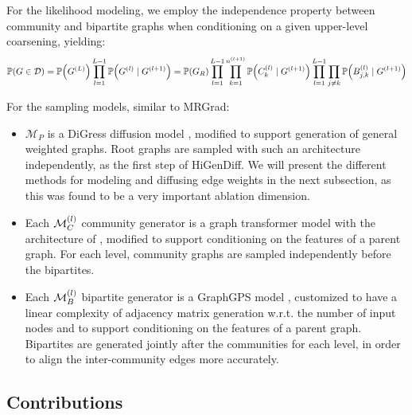 For the likelihood modeling, we employ the independence property between community and bipartite graphs when conditioning on a given upper-level coarsening, yielding:
\begin{equation}
\mathbb{P}\mathopen{}\left(G \in \mathcal{D}\right)=\mathbb{P}\mathopen{}\left(G^{\mathopen{}\left(L\right)}\right)\prod_{l=1}^{L-1}{\mathbb{P}\mathopen{}\left(G^{\mathopen{}\left(l\right)} \mid G^{\mathopen{}\left(l+1\right)}\right)}=\mathbb{P}\mathopen{}\left(G_R\right)\prod_{l=1}^{L-1}\prod_{k=1}^{n^{\mathopen{}\left(l+1\right)}}{\mathbb{P}\mathopen{}\left(C_{k}^{\mathopen{}\left(l\right)} \mid G^{\mathopen{}\left(l+1\right)}\right)}\prod_{l=1}^{L-1}\prod_{j \neq k}{\mathbb{P}\mathopen{}\left(B_{j,k}^{\mathopen{}\left(l\right)} \mid G^{\mathopen{}\left(l+1\right)}\right)}     
\end{equation}

For the sampling models, similar to MRGrad:
\begin{itemize}
    \item $\mathcal{M}_P$ is a DiGress diffusion model \cite{vignac_digress_2022}, modified to support generation of general weighted graphs. Root graphs are sampled with such an architecture independently, as the first step of HiGenDiff. We will present the different methods for modeling and diffusing edge weights in the next subsection, as this was found to be a very important ablation dimension. 
    \item Each $\mathcal{M}^{\mathopen{}\left(l\right)}_C$ community generator is a graph transformer model with the architecture of \cite{dwivedi_generalization_2021}, modified to support conditioning on the features of a parent graph. For each level, community graphs are sampled independently before the bipartites.
    \item Each $\mathcal{M}^{\mathopen{}\left(l\right)}_B$ bipartite generator is a GraphGPS model \cite{rampasek_recipe_2022}, customized to have a linear complexity of adjacency matrix generation w.r.t. the number of input nodes and to support conditioning on the features of a parent graph. Bipartites are generated jointly after the communities for each level, in order to align the inter-community edges more accurately.
\end{itemize}

\subsection{Contributions}

